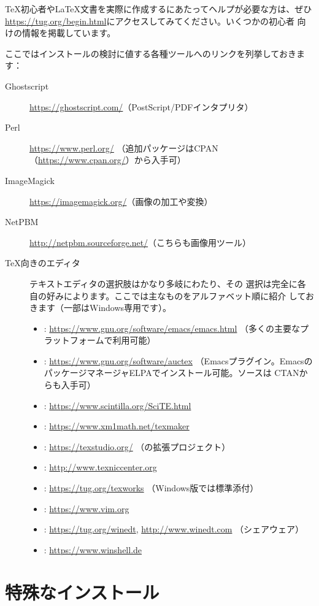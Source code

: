 \documentclass[uplatex,dvipdfmx,12pt,tombow]{jsarticle}
\begin{document}
\TeX 初心者や\LaTeX 文書を実際に作成するにあたってヘルプが必要な方は、ぜひ
\url{https://tug.org/begin.html}にアクセスしてみてください。いくつかの初心者
向けの情報を掲載しています。

ここではインストールの検討に値する各種ツールへのリンクを列挙しておきます：
%
\begin{description}
\item[Ghostscript] \url{https://ghostscript.com/}（PostScript/PDFインタプリタ）
\item[Perl] \url{https://www.perl.org/}%
  （追加パッケージはCPAN（\url{https://www.cpan.org/}）から入手可）
\item[ImageMagick] \url{https://imagemagick.org/}（画像の加工や変換）
\item[NetPBM] \url{http://netpbm.sourceforge.net/}（こちらも画像用ツール）
\item[\TeX 向きのエディタ] テキストエディタの選択肢はかなり多岐にわたり、その
  選択は完全に各自の好みによります。ここでは主なものをアルファベット順に紹介
  しておきます（一部はWindows専用です）。
  \begin{itemize}
  \item {}: \url{https://www.gnu.org/software/emacs/emacs.html}%
    （多くの主要なプラットフォームで利用可能）
  \item {}: \url{https://www.gnu.org/software/auctex}%
    （Emacsプラグイン。EmacsのパッケージマネージャELPAでインストール可能。ソースは
    CTANからも入手可）
  \item {}: \url{https://www.scintilla.org/SciTE.html}
  \item {}: \url{https://www.xm1math.net/texmaker}
  \item {}: \url{https://texstudio.org/}%
    （の拡張プロジェクト）
  \item {}: \url{http://www.texniccenter.org}
  \item {}: \url{https://tug.org/texworks}%
    （Windows版\TL では標準添付）
  \item {}: \url{https://www.vim.org}
  \item {}: \url{https://tug.org/winedt}, \url{http://www.winedt.com}%
    （シェアウェア）
  \item {}: \url{https://www.winshell.de}
  \end{itemize}
\end{description}

\section{特殊なインストール}
\end{document}
